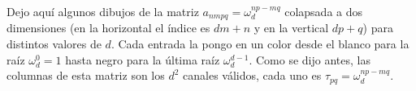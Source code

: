 Dejo aquí algunos dibujos de la matriz $a_{nmpq} = \omega_d^{np-mq}$ colapsada a dos dimensiones (en la horizontal el índice es $dm+n$ y en la vertical $dp+q$) para distintos valores de $d$. Cada entrada la pongo en un color desde el blanco para la raíz $\omega_d^0 = 1$ hasta negro para la última raíz $\omega_d^{d-1}$. Como se dijo antes, las columnas de esta matriz son los $d^2$ canales válidos, cada uno es $\tau_{pq} = \omega_d^{np-mq}$. 


\begin{figure}[h!]
    \centering
    \qquad
     \\%
\centering
    \qquad
    \\%

\end{figure}
